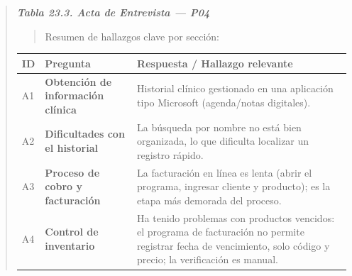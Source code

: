 \documentclass[
]{article}
\newcounter{none} %
\begin{document}
\begin{quote}
\protect{}\label{_bookmark_P04_acta}{}\emph{\textbf{Tabla 23.3. Acta de Entrevista --- P04}}

\begin{quote}
Resumen de hallazgos clave por sección:
\end{quote}

{\def\LTcaptype{none} %
\begin{longtable}[]{|
  >{\centering\arraybackslash}p{}|
  >{\raggedright\arraybackslash}p{}|
  >{\raggedright\arraybackslash}p{}|}
\hline
\begin{minipage}[b]{\linewidth}\centering
\textbf{ID}
\end{minipage} & \begin{minipage}[b]{\linewidth}\centering
\textbf{Pregunta}
\end{minipage} & \begin{minipage}[b]{\linewidth}\raggedright
\textbf{Respuesta / Hallazgo relevante}
\end{minipage} \\
\hline
\endhead
\hline
\endlastfoot
A1 & \textbf{Obtención de información clínica} &
\begin{minipage}[t]{\linewidth}\raggedright
Historial clínico gestionado en una aplicación tipo Microsoft (agenda/notas digitales).
\end{minipage} \\
\hline
A2 & \textbf{Dificultades con el historial} &
\begin{minipage}[t]{\linewidth}\raggedright
La búsqueda por nombre no está bien organizada, lo que dificulta localizar un registro rápido.
\end{minipage} \\
\hline
A3 & \textbf{Proceso de cobro y facturación} &
\begin{minipage}[t]{\linewidth}\raggedright
La facturación en línea es lenta (abrir el programa, ingresar cliente y producto); es la etapa más demorada del proceso.
\end{minipage} \\
\hline
A4 & \textbf{Control de inventario} &
\begin{minipage}[t]{\linewidth}\raggedright
Ha tenido problemas con productos vencidos: el programa de facturación no permite registrar fecha de vencimiento, solo código y precio; la verificación es manual.
\end{minipage} \\

\end{longtable}}
\end{quote}
\end{document}
